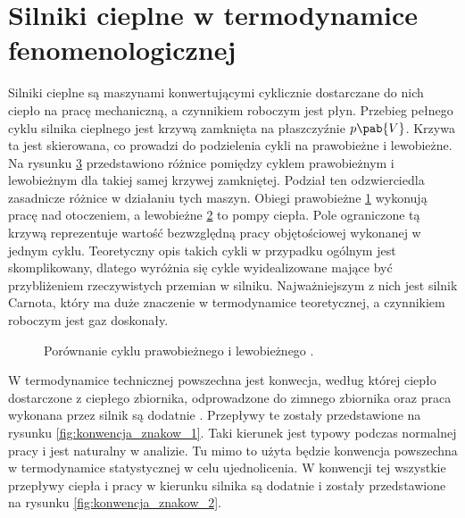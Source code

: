 
\section{Silniki cieplne w termodynamice fenomenologicznej}
Silniki cieplne są maszynami konwertującymi cyklicznie dostarczane do nich ciepło na pracę mechaniczną, a czynnikiem roboczym jest płyn. Przebieg pełnego cyklu silnika cieplnego jest krzywą zamknięta na płaszczyźnie \(p\pab{V}\). Krzywa ta jest skierowana, co prowadzi do podzielenia cykli na prawobieżne i lewobieżne. Na rysunku \ref{fig:cykl_prawo_lewo} przedstawiono różnice pomiędzy cyklem prawobieżnym i lewobieżnym dla takiej samej krzywej zamkniętej. Podział ten odzwierciedla zasadnicze różnice w działaniu tych maszyn. Obiegi prawobieżne \ref{fig:cykl_prawobiezny} wykonują pracę nad otoczeniem, a lewobieżne \ref{fig:cykl_lewobiezny} to pompy ciepła. Pole ograniczone tą krzywą reprezentuje wartość bezwzględną pracy objętościowej wykonanej w jednym cyklu. Teoretyczny opis takich cykli w przypadku ogólnym jest skomplikowany, dlatego wyróżnia się cykle wyidealizowane mające być przybliżeniem rzeczywistych przemian w silniku. Najważniejszym z nich jest silnik Carnota, który ma duże znaczenie w termodynamice teoretycznej, a czynnikiem roboczym jest gaz doskonały.

\begin{figure}[H]
	\centering
	\begin{subfigure}{0.45\textwidth}
		\centering
		
		\caption{}
		\label{fig:cykl_prawobiezny}
	\end{subfigure}
	\begin{subfigure}{0.45\textwidth}
		\centering
		
		\caption{}
		\label{fig:cykl_lewobiezny}
	\end{subfigure}
	\captionsetup{subrefformat=parens}
	\caption{Porównanie cyklu prawobieżnego  i lewobieżnego .}
	\label{fig:cykl_prawo_lewo}
\end{figure}

W termodynamice technicznej powszechna jest konwecja, według której ciepło dostarczone z ciepłego zbiornika, odprowadzone do zimnego zbiornika oraz praca wykonana przez silnik są dodatnie \cite{b:huang_podstawy_fizyki_statystycznej}. Przepływy te zostały przedstawione na rysunku \ref{fig:konwencja_znakow_1}. Taki kierunek jest typowy podczas normalnej pracy i jest naturalny w analizie. Tu mimo to użyta będzie konwencja powszechna w termodynamice statystycznej w celu ujednolicenia. W konwencji tej wszystkie przepływy ciepła i pracy w kierunku silnika są dodatnie i zostały przedstawione na rysunku \ref{fig:konwencja_znakow_2}.

